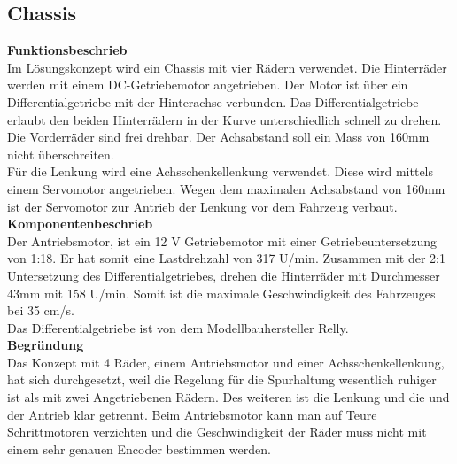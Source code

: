 \subsection{Chassis}

\textbf{Funktionsbeschrieb}
\\[0.2cm]
Im Lösungskonzept wird ein Chassis mit vier Rädern verwendet. Die Hinterräder werden mit einem DC-Getriebemotor angetrieben. Der Motor ist über ein Differentialgetriebe mit der Hinterachse verbunden. Das Differentialgetriebe erlaubt den beiden Hinterrädern in der Kurve unterschiedlich schnell zu drehen. Die Vorderräder sind frei drehbar. Der Achsabstand soll ein Mass von 160mm nicht überschreiten.\\
Für die Lenkung wird eine Achsschenkellenkung verwendet. Diese wird mittels einem Servomotor angetrieben. Wegen dem maximalen Achsabstand von 160mm ist der Servomotor zur Antrieb der Lenkung vor dem Fahrzeug verbaut. \\[0.2cm]
\textbf{Komponentenbeschrieb}
\\[0.2cm]
Der Antriebsmotor, ist ein 12 V Getriebemotor mit einer Getriebeuntersetzung von 1:18. Er hat somit eine Lastdrehzahl von 317 U/min. Zusammen mit der 2:1 Untersetzung des Differentialgetriebes, drehen die Hinterräder mit Durchmesser 43mm mit 158 U/min. Somit ist die maximale Geschwindigkeit des Fahrzeuges bei 35 cm/s.\\
Das Differentialgetriebe ist von dem Modellbauhersteller Relly. \\[0.2cm]

\textbf{Begründung}
\\[0.2cm]
Das Konzept mit 4 Räder, einem Antriebsmotor und einer Achsschenkellenkung, hat sich durchgesetzt, weil die Regelung für die Spurhaltung wesentlich ruhiger ist als mit zwei Angetriebenen Rädern. Des weiteren ist die Lenkung und die und der Antrieb klar getrennt. Beim Antriebsmotor kann man auf Teure Schrittmotoren verzichten und die Geschwindigkeit der Räder muss nicht mit einem sehr genauen Encoder bestimmen werden.